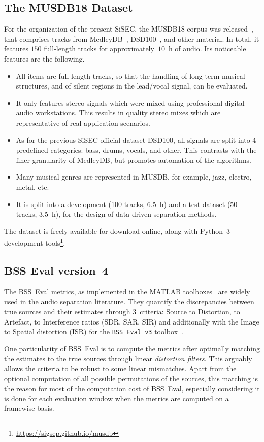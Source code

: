 \documentclass{llncs}
\begin{document}
\subsection{The MUSDB18 Dataset}
For the organization of the present SiSEC, the MUSDB18 corpus was released~\cite{musdb18}, that comprises tracks from MedleyDB~\cite{medleydb}, DSD100~\cite{sisec2015,sisec2016}, and other material. In total, it features $150$ full-length tracks for approximately~$10$~h of audio. Its noticeable features are the following.
\begin{itemize}
\item All items are full-length tracks, so that the handling of long-term musical structures, and of silent regions in the lead/vocal signal, can be evaluated.
\item It only features stereo signals which were mixed using professional digital audio workstations. This results in quality stereo mixes which are representative of real application scenarios.
\item As for the previous SiSEC official dataset DSD100, all signals are split into 4 predefined categories: bass, drums, vocals, and other. This contrasts with the finer granularity of MedleyDB, but promotes automation of the algorithms.
\item Many musical genres are represented in MUSDB, for example, jazz, electro, metal, etc.
\item It is split into a development (100 tracks, 6.5~h) and a test dataset (50 tracks, 3.5~h), for the design of data-driven separation methods.
\end{itemize}
The dataset is freely available for download online, along with Python~3 development tools\footnote{\url{https://sigsep.github.io/musdb}}.

\subsection{BSS Eval version~4}
The BSS~Eval metrics, as implemented in the MATLAB toolboxes~\cite{bssevalv2,bssevalv3} are widely used in the audio separation literature. They quantify the discrepancies between true sources and their estimates through $3$~criteria: Source to Distortion, to Artefact, to Interference ratios (SDR, SAR, SIR) and additionally with the Image to Spatial distortion (ISR) for the \texttt{BSS~Eval v3} toolbox~\cite{bssevalv3}.

One particularity of BSS~Eval is to compute the metrics after optimally matching the estimates to the true sources through linear \textit{distortion filters}. This arguably allows the criteria to be robust to some linear mismatches. Apart from the optional computation of all possible permutations of the sources, this matching is the reason for most of the computation cost of BSS~Eval, especially considering it is done for each evaluation window when the metrics are computed on a framewise basis.
\end{document}
